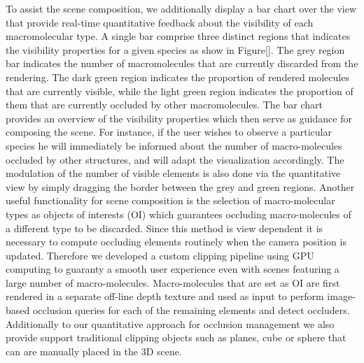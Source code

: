 To assist the scene composition, we additionally display a bar chart over the view that provide real-time quantitative feedback about the visibility of each macromolecular type.
A single bar comprise three distinct regions that indicates the visibility properties for a given species as show in Figure[].
The grey region bar indicates the number of macromolecules that are currently discarded from the rendering.
The dark green region indicates the proportion of rendered molecules that are currently visible, while the light green region indicates the proportion of them that are currently occluded by other macromolecules.
The bar chart provides an overview of the visibility properties which then serve as guidance for composing the scene.
For instance, if the user wishes to observe a particular species he will immediately be informed about the number of macro-molecules occluded by other structures, and will adapt the visualization accordingly.
The modulation of the number of visible elements is also done via the quantitative view by simply dragging the border between the grey and green regions. 
Another useful functionality for scene composition is the selection of macro-molecular types as objects of interests (OI) which guarantees occluding macro-molecules of a different type to be discarded.
Since this method is view dependent it is necessary to compute occluding elements routinely when the camera position is updated.
Therefore we developed a custom clipping pipeline using GPU computing to guaranty a smooth user experience even with scenes featuring a large number of macro-molecules.
Macro-molecules that are set as OI are first rendered in a separate off-line depth texture and used as input to perform image-based occlusion queries for each of the remaining elements and detect occluders.
Additionally to our quantitative approach for occlusion management we also provide support traditional clipping objects such as planes, cube or sphere that can are manually placed in the 3D scene.

